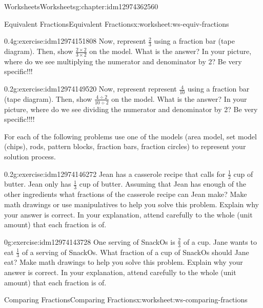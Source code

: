 \documentclass[twoside,11pt,]{book}
\begin{document}
\begin{chapterptx}{Worksheets}{}{Worksheets}{}{}{g:chapter:idm12974362560}
\begin{worksheet-section-numberless}{Equivalent Fractions}{}{Equivalent Fractions}{}{}{x:worksheet:ws-equiv-fractions}
\begin{divisionexercise}{2}{}{0.4}{g:exercise:idm12974151808}%
Now, represent \(\frac{2}{3} \) using a fraction bar (tape diagram). Then, show  \(\frac{2 \times 2}{3 \times 2} \) on the model. What is the answer? In your picture, where do we see multiplying the numerator and denominator by 2? Be very specific!!!%
\end{divisionexercise}%
\begin{divisionexercise}{3}{}{0.2}{g:exercise:idm12974149520}%
Now, represent represent \(\frac{4}{10} \) using a fraction bar (tape diagram). Then, show  \(\frac{4 \div 2}{10 \div 2} \) on the model. What is the answer? In your picture, where do we see dividing the numerator and denominator by 2? Be very specific!!!!%
\end{divisionexercise}%
\begin{introduction}{}%
For each of the following problems use one of the models (area model, set model (chips), rods, pattern blocks, fraction bars, fraction circles) to represent your solution process.%
\end{introduction}%
\begin{divisionexercise}{4}{}{0.2}{g:exercise:idm12974146272}%
Jean has a casserole recipe that calls for \(\frac{1}{2} \) cup of butter. Jean only has \(\frac{1}{3} \) cup of butter. Assuming that Jean has enough of the other ingredients what fractions of the casserole recipe can Jean make? Make math drawings or use manipulatives to help you solve this problem. Explain why your answer is correct. In your explanation, attend carefully to the whole (unit amount) that each fraction is of.%
\end{divisionexercise}%
\begin{divisionexercise}{5}{}{0}{g:exercise:idm12974143728}%
One serving of SnackOs is \(\frac{2}{3} \) of a cup. Jane wants to eat \(\frac{1}{3} \) of a serving of SnackOs. What fraction of a cup of SnackOs should Jane eat? Make math drawings to help you solve this problem. Explain why your answer is correct. In your explanation, attend carefully to the whole (unit amount) that each fraction is of.%
\end{divisionexercise}%
\end{worksheet-section-numberless}
\restoregeometry
%
%
\typeout{************************************************}
\typeout{************************************************}
%
\begin{worksheet-section-numberless}{Comparing Fractions}{}{Comparing Fractions}{}{}{x:worksheet:ws-comparing-fractions}

\end{worksheet-section-numberless}
\end{chapterptx}
\end{document}
